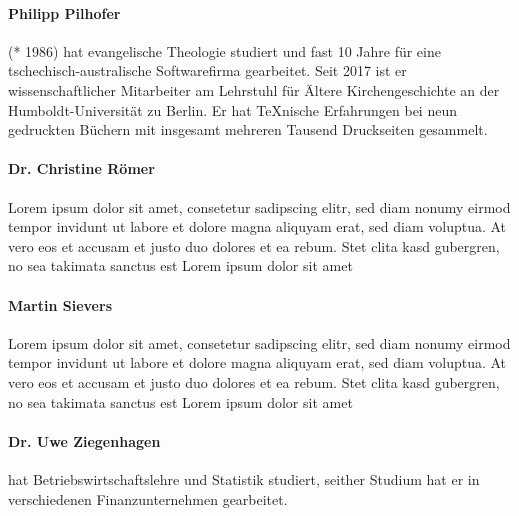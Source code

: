 \paragraph{Philipp Pilhofer} (* 1986) hat evangelische Theologie studiert und fast 10 Jahre für eine tschechisch-australische Softwarefirma gearbeitet. Seit 2017 ist er wissenschaftlicher Mitarbeiter am Lehrstuhl für Ältere Kirchengeschichte an der Humboldt-Universität zu Berlin. Er hat \TeX{}nische Erfahrungen bei neun gedruckten Büchern mit insgesamt mehreren Tausend Druckseiten gesammelt.

\paragraph{Dr. Christine Römer} Lorem ipsum dolor sit amet, consetetur sadipscing elitr, sed diam nonumy eirmod tempor invidunt ut labore et dolore magna aliquyam erat, sed diam voluptua. At vero eos et accusam et justo duo dolores et ea rebum. Stet clita kasd gubergren, no sea takimata sanctus est Lorem ipsum dolor sit amet

\paragraph{Martin Sievers} Lorem ipsum dolor sit amet, consetetur sadipscing elitr, sed diam nonumy eirmod tempor invidunt ut labore et dolore magna aliquyam erat, sed diam voluptua. At vero eos et accusam et justo duo dolores et ea rebum. Stet clita kasd gubergren, no sea takimata sanctus est Lorem ipsum dolor sit amet

\paragraph{Dr. Uwe Ziegenhagen} hat Betriebswirtschaftslehre und Statistik studiert, seither Studium hat er in verschiedenen Finanzunternehmen gearbeitet. 


